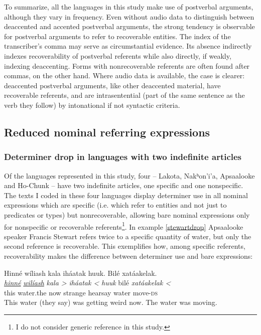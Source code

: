 \documentclass[output=paper]{LSP/langsci}
\begin{document}
To summarize, all the languages in this study make use of postverbal arguments, although they vary in frequency. Even without audio data to distinguish between deaccented and accented postverbal arguments, the strong tendency is observable for postverbal arguments to refer to recoverable entities. The index of the transcriber’s comma may serve as circumstantial evidence. Its absence indirectly indexes recoverability of postverbal referents while also directly, if weakly, indexing deaccenting. Forms with nonrecoverable referents are often found after commas, on the other hand. Where audio data is available, the case is clearer: deaccented postverbal arguments, like other deaccented material, have recoverable referents, and are intrasentential (part of the same sentence as the verb they follow) by intonational if not syntactic criteria.

\subsection{Reduced nominal referring expressions}\label{nominalreduction}

\subsubsection{Determiner drop in languages with two indefinite articles}\label{droptwoindef}

Of the languages represented in this study, four -- Lakota, Nakʰon’i’a, Apsaalooke and Ho-Chunk -- have two indefinite articles, one specific and one nonspecific. The texts I coded in these four languages display determiner use in all nominal expressions which are specific (i.e. which refer to entities and not just to predicates or types) but nonrecoverable, allowing bare nominal expressions only for nonspecific or recoverable referents\footnote{I do not consider generic reference in this study.}. In example \ref{stewartdrop} Apsaalooke speaker Francis Stewart refers twice to a specific quantity of water, but only the second reference is recoverable. This exemplifies how, among specific referents, recoverability makes the difference between determiner use and bare expressions:

\ea\label{stewartdrop}
Hinné wíliash kala iháatak huuk. Bilé xatáakelak.\footnotemark\\
\gll	\emph{\underline{hinné}} 	\emph{\underline{wilíash}} 		\emph{kala >} 	\emph{iháatak <}		\emph{huuk} 	bilé 		\emph{xatáakelak <}\\
	this 				water.the 					now 			strange 			hearsay 		water		move-\textsc{ds}\\
\glt	This water (they say) was getting weird now. The water was moving.
\z
\end{document}
